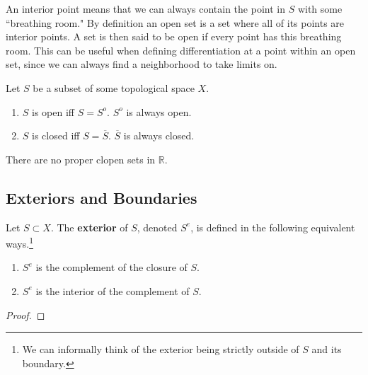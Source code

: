   An interior point means that we can always contain the point in $S$ with some ``breathing room." By definition an open set is a set where all of its points are interior points. A set is then said to be open if every point has this breathing room. This can be useful when defining differentiation at a point within an open set, since we can always find a neighborhood to take limits on. 

  \begin{lemma}
    Let $S$ be a subset of some topological space $X$. 
    \begin{enumerate}
      \item $S$ is open iff $S = S^{o}$. $S^{o}$ is always open.
      \item $S$ is closed iff $S = \overline{S}$. $\overline{S}$ is always closed. 
    \end{enumerate}
  \end{lemma}

  \begin{theorem}
    There are no proper clopen sets in $\mathbb{R}$. 
  \end{theorem}

\subsection{Exteriors and Boundaries}

  \begin{definition}[Exteriors]
    Let $S \subset X$. The \textbf{exterior} of $S$, denoted $S^e$, is defined in the following equivalent ways.\footnote{We can informally think of the exterior being strictly outside of $S$ and its boundary.}
    \begin{enumerate}
      \item $S^e$ is the complement of the closure of $S$. 
      \item $S^e$ is the interior of the complement of $S$. 
    \end{enumerate}
  \end{definition}
  \begin{proof}
    
  \end{proof}

